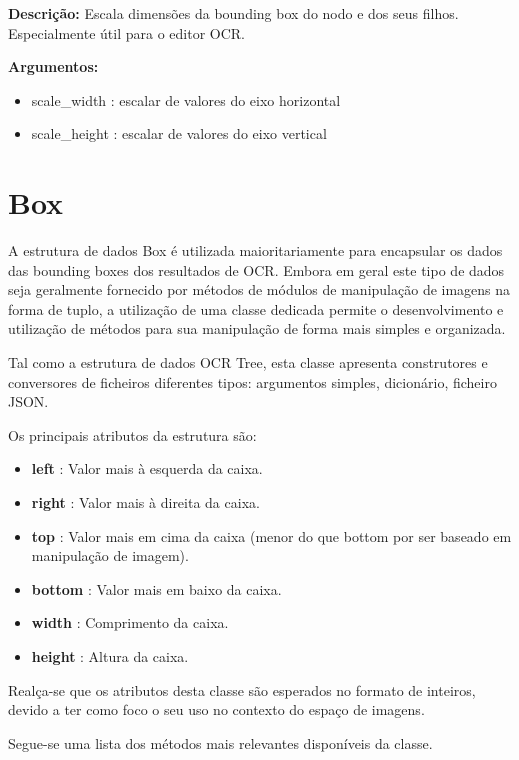 
\textbf{Descrição:} Escala dimensões da bounding box do nodo e dos seus filhos. Especialmente útil para o editor OCR.

\textbf{Argumentos:}
\begin{itemize}\setlength\itemsep{-0.3em}
	\item scale\_width : escalar de valores do eixo horizontal
	\item scale\_height : escalar de valores do eixo vertical
\end{itemize}


\section{Box}
\label{box_data_structure}

A estrutura de dados Box é utilizada maioritariamente para encapsular os dados das bounding boxes dos resultados de OCR. Embora em geral este tipo de dados seja geralmente fornecido por métodos de módulos de manipulação de imagens na forma de tuplo, a utilização de uma classe dedicada permite o desenvolvimento e utilização de métodos para sua manipulação de forma mais simples e organizada.

Tal como a estrutura de dados OCR Tree, esta classe apresenta construtores e conversores de ficheiros diferentes tipos: argumentos simples, dicionário, ficheiro JSON.

Os principais atributos da estrutura são:

\begin{itemize}\setlength\itemsep{-0.3em}
	\item \textbf{left} 	: Valor mais à esquerda da caixa.
	\item \textbf{right}	: Valor mais à direita da caixa.
	\item \textbf{top} 		: Valor mais em cima da caixa (menor do que bottom por ser baseado em manipulação de imagem). 
	\item \textbf{bottom} 	: Valor mais em baixo da caixa.
	\item \textbf{width} 	: Comprimento da caixa.
	\item \textbf{height} 	: Altura da caixa.
\end{itemize}

Realça-se que os atributos desta classe são esperados no formato de inteiros, devido a ter como foco o seu uso no contexto do espaço de imagens.

Segue-se uma lista dos métodos mais relevantes disponíveis da classe.

